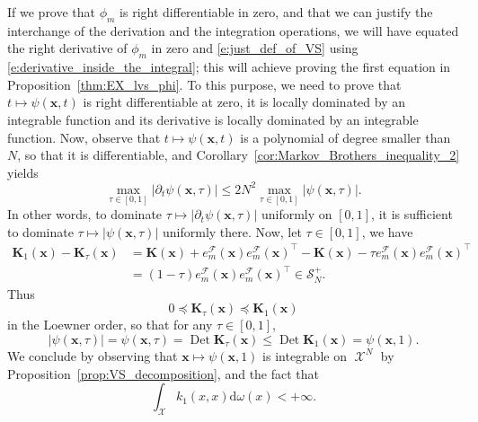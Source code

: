 \documentclass[twoside,11pt]{book}
\numberwithin{theorem}{chapter}
\numberwithin{definition}{chapter}
\numberwithin{proposition}{chapter}
\numberwithin{corollary}{chapter}
\numberwithin{example}{chapter}
\numberwithin{lemma}{chapter}
\DeclareMathOperator{\Det}{Det}
\DeclareMathOperator{\Tran}{\intercal}
\DeclareMathOperator{\X}{\mathcal{X}}
\begin{document}
 If we prove that $\phi_{m}$ is right differentiable in zero, and that we can justify the interchange of the derivation and the integration operations, we will have equated the right derivative of $\phi_m$ in zero and \eqref{e:just_def_of_VS} using \eqref{e:derivative_inside_the_integral}; this will achieve proving the first equation in Proposition~\ref{thm:EX_lvs_phi}. To this purpose, we need to prove that $t \mapsto \psi(\bm{x},t)$ is right differentiable at zero, it is locally dominated by an integrable function and its derivative is locally dominated by an integrable function. Now, observe that $t \mapsto \psi(\bm{x},t)$ is a polynomial of degree smaller than $N$, so that it is differentiable, and Corollary~\ref{cor:Markov_Brothers_inequality_2} yields
\begin{equation}
\max_{\tau \in [0,1]} \left|\partial_t \psi(\bm{x},\tau)\right| \leq 2N^{2} \max_{\tau \in [0,1]} \left|\psi(\bm{x},\tau)\right|.
\end{equation}
 In other words, to dominate $\tau \mapsto |\partial_t \psi(\bm{x},\tau)|$ uniformly on $[0,1]$, it is sufficient to dominate $\tau \mapsto| \psi(\bm{x},\tau)|$ uniformly there. Now, let $\tau \in [0,1]$, we have
\begin{align}
\bm{K}_{1}(\bm{x}) - \bm{K}_{\tau}(\bm{x}) &  = \bm{K}(\bm{x}) + e_{m}^{\mathcal{F}}(\bm{x})e_{m}^{\mathcal{F}}(\bm{x})^{\Tran} - \bm{K}(\bm{x}) - \tau e_{m}^{\mathcal{F}}(\bm{x})e_{m}^{\mathcal{F}}(\bm{x})^{\Tran}\\
& = (1-\tau)e_{m}^{\mathcal{F}}(\bm{x})e_{m}^{\mathcal{F}}(\bm{x})^{\Tran} \in \mathcal{S}_{N}^{+}.
\end{align}
Thus
\begin{equation}
0\preceq \bm{K}_{\tau}(\bm{x}) \preceq \bm{K}_{1}(\bm{x})
\end{equation}
in the Loewner order, so that for any $\tau\in [0,1]$,
\begin{equation}
|\psi(\bm{x},\tau)| = \psi(\bm{x},\tau) =\Det \bm{K}_{\tau}(\bm{x}) \leq \Det \bm{K}_{1}(\bm{x}) = \psi(\bm{x},1) .
\end{equation}
We conclude by observing that $\bm{x} \mapsto \psi(\bm{x},1)$ is integrable on $\X^{N}$ by Proposition~\ref{prop:VS_decomposition}, and the fact that
\begin{equation}
\int_{\X} k_{1}(x,x) \mathrm{d}\omega(x) < +\infty.
\end{equation}
\end{document}

